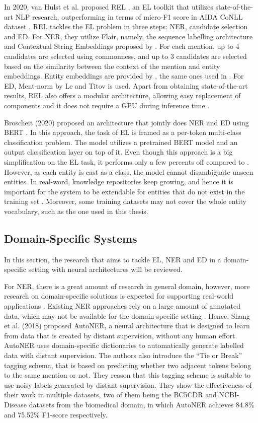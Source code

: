 \documentclass{report}
\theoremstyle{definition}
\theoremstyle{remark}
\begin{document}
In 2020, van Hulst et al. proposed REL \cite{REL}, an EL toolkit that utilizes state-of-the-art NLP research, outperforming \cite{kolitsas} in terms of micro-F1 score in AIDA CoNLL dataset \cite{CoNLLYago}. REL tackles the EL problem in three steps: NER, candidate selection and ED. For NER, they utilize Flair, namely, the sequence labelling architecture and Contextual String Embeddings proposed by \cite{flairpaper}. For each mention, up to 4 candidates are selected using commonness, and up to 3 candidates are selected based on the similarity between the context of the mention and entity embeddings. Entity embeddings are provided by \cite{kolitsasEmbed}, the same ones used in \cite{kolitsas}. For ED, Ment-norm by Le and Titov \cite{mentnorm} is used. Apart from obtaining state-of-the-art results, REL also offers a modular architecture, allowing easy replacement of components and it does not require a GPU during inference time \cite{REL}. 

Broscheit (2020) \cite{bertEL} proposed an architecture that jointly does NER and ED using BERT \cite{BERT}. In this approach, the task of EL is framed as a per-token multi-class classification problem. The model utilizes a pretrained BERT model and an output classification layer on top of it. Even though this approach is a big simplification on the EL task, it performs only a few percents off compared to \cite{kolitsas}.  However, as each entity is cast as a class, the model cannot disambiguate unseen entities. In real-word, knowledge repositories keep growing, and hence it is important for the system to be extendable for entities that do not exist in the training set \cite{gupta}. Moreover, some training datasets may not cover the whole entity vocabulary, such as the one used in this thesis.

\subsection{Domain-Specific Systems}
\label{domSpec}
In this section, the research that aims to tackle EL, NER and ED in a domain-specific setting with neural architectures will be reviewed.

For NER, there is a great amount of research in general domain, however, more research on domain-specific solutions is expected for supporting real-world applications \cite{quote1}. Existing NER approaches rely on a large amount of annotated data, which may not be available for the domain-specific setting \cite{NERDict2}. Hence, Shang et al. (2018) \cite{NERDict2} proposed AutoNER, a neural architecture that is designed to learn from data that is created by distant supervision, without any human effort. AutoNER uses domain-specific dictionaries to automatically generate labelled data with distant supervision. The authors also introduce the ``Tie or Break'' tagging schema, that is based on predicting whether two adjacent tokens belong to the same mention or not. They reason that this tagging scheme is suitable to use noisy labels generated by distant supervision. They show the effectiveness of their work in multiple datasets, two of them being the BC5CDR \cite{bc5cdr} and NCBI-Disease \cite{ncbi} datasets from the biomedical domain, in which AutoNER achieves 84.8\% and 75.52\% F1-score respectively.
\end{document}
